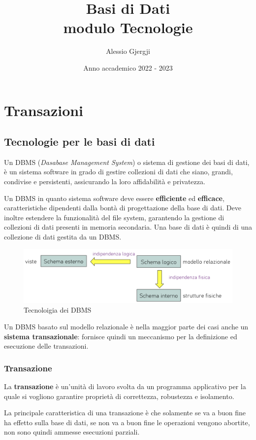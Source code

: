 \documentclass[oneside,a4paper,11pt]{book}
\title{Basi di Dati \\ \large{modulo Tecnologie}}
\author{Alessio Gjergji}
\date{Anno accademico 2022 - 2023}
\theoremstyle{italicstyle}
\theoremstyle{normStyle}
\begin{document}
\hypersetup{ %
    linktoc=all,     %
    linkcolor=black,  %
}
\maketitle
\tableofcontents
\chapter{Transazioni}
\section{Tecnologie per le basi di dati}
Un DBMS (\textit{Dasabase Management System}) o sistema di gestione dei basi 
di dati, è un sistema software in grado di gestire collezioni di dati che 
siano, grandi, condivise e persistenti, assicurando la loro affidabilità 
e privatezza.

Un DBMS in quanto sistema software deve essere \textbf{efficiente} ed \textbf{efficace}, 
caratteristiche dipendenti dalla bontà di progettazione della base 
di dati. Deve inoltre estendere la funzionalità del file system, garantendo la 
gestione di collezioni di dati presenti in memoria secondaria.
Una base di dati è quindi di una collezione di dati gestita da un DBMS.
\begin{figure}[H]
    \centering
    \includegraphics[width=15cm]{img/architetturaDBMS.jpeg}
    \caption{Tecnoloigia dei DBMS}
    \label{fig:tec_DBMS}
  \end{figure}
Un DBMS basato sul modello relazionale è nella maggior parte dei casi 
anche un \textbf{sistema transazionale}: fornisce quindi un meccanismo 
per la definizione ed esecuzione delle transazioni.
\subsection{Transazione}
\begin{tcolorbox}
La \textbf{transazione} è un'unità di lavoro svolta da un programma applicativo per 
la quale si vogliono garantire proprietà di correttezza, robustezza e isolamento.
\end{tcolorbox}
La principale caratteristica di una transazione è che solamente se va a buon fine 
ha effetto sulla base di dati, se non va a buon fine le operazioni vengono 
abortite, non sono quindi ammesse esecuzioni parziali.
\end{document}
